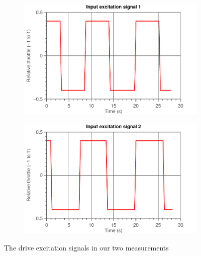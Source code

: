 \documentclass[11pt,titlepage]{report}
\begin{document}
\begin{figure}[H]
	\begin{subfigure}{.5\textwidth}
		\begin{center}
			\includegraphics[width=\linewidth]{resource/drive-excitation1.pdf}
		\end{center}
	\end{subfigure}
	\begin{subfigure}{.5\textwidth}
		\begin{center}
			\includegraphics[width=\linewidth]{resource/drive-excitation2.pdf}
		\end{center}
	\end{subfigure}
	\caption{The drive excitation signals in our two measurements}
	\label{fig:ass1-excitation}
\end{figure}
\end{document}
